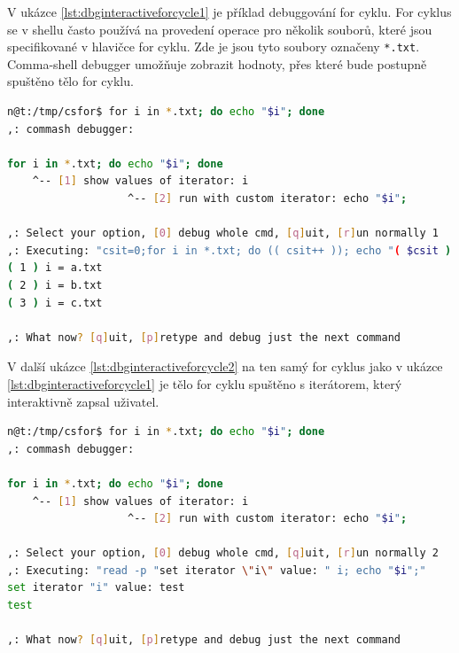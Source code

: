 \documentclass[thesis=M,czech]{FITthesis}[2012/06/26]
\begin{document}
V ukázce \ref{lst:dbginteractiveforcycle1} je příklad debuggování for cyklu. For cyklus se v shellu často používá na provedení operace pro několik souborů, které jsou specifikované v hlavičce for cyklu. Zde je jsou tyto soubory označeny \texttt{*.txt}. Comma-shell debugger umožňuje zobrazit hodnoty, přes které bude postupně spuštěno tělo for cyklu.

\begin{minipage}{\linewidth}
\begin{lstlisting}[language=bash, caption={Debugger interaktivního shellu - výpis hodnot iterátoru for cyklu }, label={lst:dbginteractiveforcycle1}]
n@t:/tmp/csfor$ for i in *.txt; do echo "$i"; done
,: commash debugger:

for i in *.txt; do echo "$i"; done
    ^-- [1] show values of iterator: i
                   ^-- [2] run with custom iterator: echo "$i";

,: Select your option, [0] debug whole cmd, [q]uit, [r]un normally 1
,: Executing: "csit=0;for i in *.txt; do (( csit++ )); echo "( $csit ) i = $i"; done"
( 1 ) i = a.txt
( 2 ) i = b.txt
( 3 ) i = c.txt

,: What now? [q]uit, [p]retype and debug just the next command
\end{lstlisting}
\end{minipage}

V další ukázce \ref{lst:dbginteractiveforcycle2} na ten samý for cyklus jako v ukázce \ref{lst:dbginteractiveforcycle1} je tělo for cyklu spuštěno s iterátorem, který interaktivně zapsal uživatel.

\begin{minipage}{\linewidth}
\begin{lstlisting}[language=bash, caption={Debugger interaktivního shellu - změna iterátoru for cyklu}, label={lst:dbginteractiveforcycle2}]
n@t:/tmp/csfor$ for i in *.txt; do echo "$i"; done
,: commash debugger:

for i in *.txt; do echo "$i"; done
    ^-- [1] show values of iterator: i
                   ^-- [2] run with custom iterator: echo "$i";

,: Select your option, [0] debug whole cmd, [q]uit, [r]un normally 2
,: Executing: "read -p "set iterator \"i\" value: " i; echo "$i";"
set iterator "i" value: test
test

,: What now? [q]uit, [p]retype and debug just the next command
\end{lstlisting}
\end{minipage}
\end{document}
